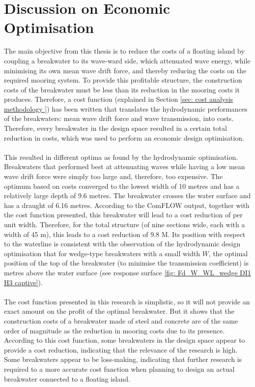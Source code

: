 \section{Discussion on Economic Optimisation}


The main objective from this thesis is to reduce the costs of a floating island by coupling a breakwater to its wave-ward side, which attenuated wave energy, while minimising its own mean wave drift force, and thereby reducing the costs on the required mooring system. To provide this profitable structure, the construction costs of the breakwater must be less than its reduction in the mooring costs it produces. Therefore, a cost function (explained in Section \ref{sec: cost analysis methodology }) has been written that translates the hydrodynamic performances of the breakwaters: mean wave drift force and wave transmission, into costs. Therefore, every breakwater in the design space resulted in a certain total reduction in costs, which was used to perform an economic design optimisation.\\
\\
This resulted in different optima as found by the hydrodynamic optimisation. Breakwaters that performed best at attenuating waves while having a low mean wave drift force were simply too large and, therefore, too expensive. The optimum based on costs converged to the lowest width of 10 metres and has a relatively large depth of 9.6 metres. The breakwater crosses the water surface and has a draught of 6.16 metres. According to the ComFLOW output, together with the cost function presented, this breakwater will lead to a cost reduction of  per unit width. Therefore, for the total structure (of nine sections wide, each with a width of 45 m), this leads to a cost reduction of 9.8 M\texteuro. Its position with respect to the waterline is consistent with the observation of the hydrodynamic design optimisation that for wedge-type breakwaters with a small width $W$, the optimal position of the top of the breakwater (to minimise the transmission coefficient) is metres above the water surface (see response surface \ref{fig: Fd_W_WL_wedge DI1 H3 captive}). \\
\\
The cost function presented in this research is simplistic, so it will not provide an exact amount on the profit of the optimal breakwater. But it shows that the construction costs of a breakwater made of steel and concrete are of the same order of magnitude as the reduction in mooring costs due to its presence. According to this cost function, some breakwaters in the design space appear to provide a cost reduction, indicating that the relevance of the research is high. Some breakwaters appear to be loss-making, indicating that further research is required to a more accurate cost function when planning to design an actual breakwater connected to a floating island. \\
